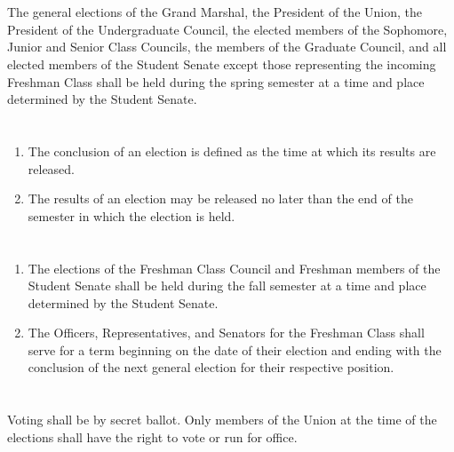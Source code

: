 \section{}
The general elections of the Grand Marshal, the President of the Union, the President of the Undergraduate Council, the elected members of the Sophomore, Junior and Senior Class Councils, the members of the Graduate Council, and all elected members of the Student Senate except those representing the incoming Freshman Class shall be held during the spring semester at a time and place determined by the Student Senate.

\section{}
\begin{enumerate}
\item The conclusion of an election is defined as the time at which its results are released.
\item The results of an election may be released no later than the end of the semester in which the
election is held.
\end{enumerate}

\section{}
\begin{enumerate}
\item The elections of the Freshman Class Council and Freshman members of the Student Senate shall
be held during the fall semester at a time and place determined by the Student Senate.
\item The Officers, Representatives, and Senators for the Freshman Class shall serve for a term
beginning on the date of their election and ending with the conclusion of the next general
election for their respective position.
\end{enumerate}

\section{}
Voting shall be by secret ballot. Only members of the Union at the time of the elections shall have the right to vote or run for office.

